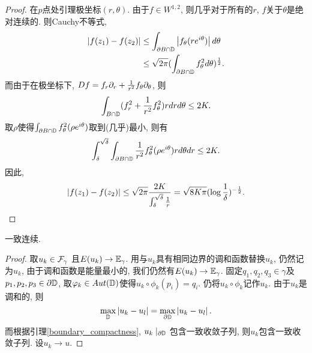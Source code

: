 \begin{proof}
    在$p$点处引理极坐标$(r,\theta)$. 由于$f \in W^{1,2}$, 则几乎对于所有的$r$, $f$关于$\theta$是绝对连续的.  则Cauchy不等式, 
    \begin{equation}
        \begin{split}
            \abs{f(z_1)-f(z_2)} &\le \int_{\P B \cap \D} \abs{f_\theta(re^{i\theta})}d\theta \\
            & \le \sqrt{2\pi} (\int_{\P B\cap \D} f^2_\theta d\theta)^{\frac{1}{2}}.
        \end{split}
    \end{equation}
    而由于在极坐标下, $Df=f_r \P_r + \frac{1}{r^2}f_\theta \P_\theta$, 则
    \begin{equation}
        \int_{B \cap \D} (f_r^2 + \frac{1}{r^2}f_\theta^2)r drd\theta \le 2K.
    \end{equation}
    取$\rho$使得$\int_{\P B \cap \D} f^2_\theta(\rho e^{i\theta})$取到(几乎)最小, 则有
    \begin{equation}
        \int^{\sqrt{\delta}}_\delta \int_{\P B \cap \D}\frac{1}{r^2}f^2_\theta(\rho e^{i\theta}) rd\theta dr \le 2K.
    \end{equation}
    因此, 
    \begin{equation}
        \abs{f(z_1)-f(z_2)} \le \sqrt{2\pi} \frac{2K}{ \int^{\sqrt{\delta}}_\delta \frac{1}{r}} = \sqrt{8K\pi}(\log \frac{1}{\delta})^{-\frac{1}{2}}.
    \end{equation}
\end{proof}
\begin{lemma} \label{boundary_compactness}
    一致连续.
\end{lemma}
\begin{proof}%
    取$u_k \in \FG$ 且$E(u_k) \to \EG$. 用与$u_k$具有相同边界的调和函数替换$u_k$, 仍然记为$u_k$, 由于调和函数是能量最小的, 我们仍然有$E(u_k) \to \EG$. 固定$q_1,q_2,q_3 \in \gamma$及 $p_1,p_2,p_3 \in \P \D$, 取$\phi_k \in Aut(\D)$使得$u_k\circ \phi_k(p_i)=q_i$. 仍将$u_k \circ \phi_k$记作$u_k$. 由于$u_k$是调和的, 则
    \begin{equation}
        \max_{\D}\abs{u_k - u_l} = \max_{\P \D} \abs{u_k-u_l}.
    \end{equation}
    而根据引理\eqref{boundary_compactness}, $u_k\mid_{\P \D}$ 包含一致收敛子列, 则$u_k$包含一致收敛子列. 设$u_k \to u$.
\end{proof}